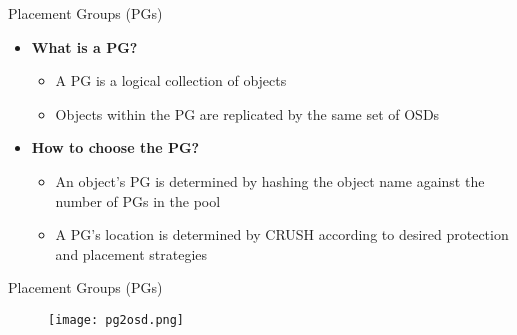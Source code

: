 \begin{frame}{Placement Groups (PGs)}
    \begin{itemize}
        \item \textbf{What is a PG?}
            \begin{itemize}
                \item A PG is a logical collection of objects
                \item Objects within the PG are replicated by the same set of OSDs
            \end{itemize}
        \item \textbf{How to choose the PG?}
            \begin{itemize}
                \item An object's PG is determined by hashing the object name against the number of PGs in the pool
                \item A PG's location is determined by CRUSH according to desired protection and placement strategies
            \end{itemize}
    \end{itemize}
\end{frame}

\begin{frame}{Placement Groups (PGs)}
    \begin{figure}[htpb]
        \centering
        \texttt{[image: pg2osd.png]}
    \end{figure}
\end{frame}


